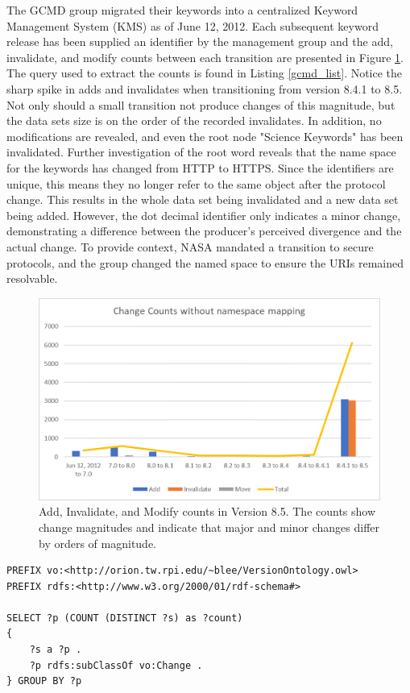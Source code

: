The GCMD group migrated their keywords into a centralized Keyword Management System (KMS) as of June 12, 2012.
Each subsequent keyword release has been supplied an identifier by the management group and the add, invalidate, and modify counts between each transition are presented in Figure \ref{GCMDC1}.
The query used to extract the counts is found in Listing \ref{gcmd_list}.
Notice the sharp spike in adds and invalidates when transitioning from version 8.4.1 to 8.5.
Not only should a small transition not produce changes of this magnitude, but the data sets size is on the order of the recorded invalidates.
In addition, no modifications are revealed, and even the root node "Science Keywords" has been invalidated.
Further investigation of the root word reveals that the name space for the keywords has changed from HTTP to HTTPS.
Since the identifiers are unique, this means they no longer refer to the same object after the protocol change.
This results in the whole data set being invalidated and a new data set being added.
However, the dot decimal identifier only indicates a minor change, demonstrating a difference between the producer's perceived divergence and the actual change.
To provide context, NASA mandated a transition to secure protocols, and the group changed the named space to ensure the URIs remained resolvable.

\begin{figure}%
	\centering
	\includegraphics[scale=1]{figures/GCMDChart1.png}
	\caption{Add, Invalidate, and Modify counts in Version 8.5.  The counts show change magnitudes and indicate that major and minor changes differ by orders of magnitude.}
	\label{GCMDC1}
\end{figure}

\hfill \break
\begin{lstlisting}[language=SPARQL, caption=This query compiles the counts for each subclass of Change in a GCMD versioning graph,label=gcmd_list]
PREFIX vo:<http://orion.tw.rpi.edu/~blee/VersionOntology.owl>
PREFIX rdfs:<http://www.w3.org/2000/01/rdf-schema#>

SELECT ?p (COUNT (DISTINCT ?s) as ?count)
{
	?s a ?p .
	?p rdfs:subClassOf vo:Change .
} GROUP BY ?p
\end{lstlisting}

